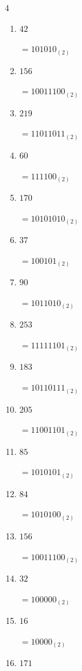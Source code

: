 \begin{multicols}{4}
\begin{enumerate}
        $=10110011_{(2)}$

  \item $42$

        $=101010_{(2)}$

  \item $156$

        $=10011100_{(2)}$

  \item $219$

        $=11011011_{(2)}$

  \item $60$

        $=111100_{(2)}$

  \item $170$

        $=10101010_{(2)}$

  \item $37$

        $=100101_{(2)}$

  \item $90$

        $=1011010_{(2)}$

  \item $253$

        $=11111101_{(2)}$

  \item $183$

        $=10110111_{(2)}$

\columnbreak %

\resetques

  \item $205$

        $=11001101_{(2)}$

  \item $85$

        $=1010101_{(2)}$

  \item $84$

        $=1010100_{(2)}$

  \item $156$

        $=10011100_{(2)}$

  \item $32$

        $=100000_{(2)}$

  \item $16$

        $=10000_{(2)}$

  \item $171$


\end{enumerate}
\end{multicols}
